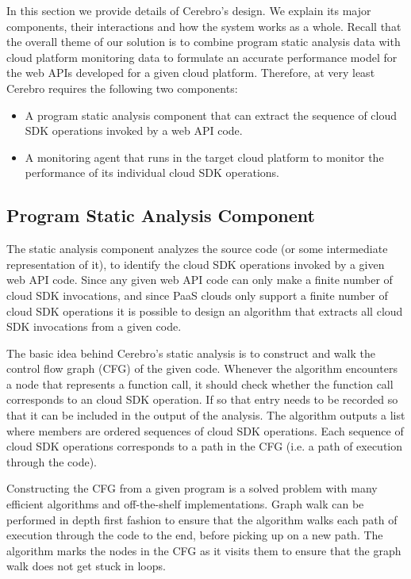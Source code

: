 In this section we provide details of Cerebro's design. We explain its major components, their interactions and how the 
system works as a whole. Recall that the overall theme of our solution is to combine program
static analysis data with cloud platform monitoring data to formulate an accurate performance model for the 
web APIs developed for a given cloud platform. Therefore, at very least Cerebro requires the following two components:

\begin{itemize}
\item A program static analysis component that can extract the sequence of cloud SDK operations invoked by a web API
code.
\item A monitoring agent that runs in the target cloud platform to monitor the performance of its individual cloud SDK
operations.
\end{itemize}
 
 \subsection{Program Static Analysis Component}
 The static analysis component analyzes the source code (or some intermediate representation of it), to identify
 the cloud SDK operations invoked by a given web API code. Since any given web API code can only make a finite
 number of cloud SDK invocations, and since PaaS clouds only support a finite number of cloud
 SDK operations it is possible to design an algorithm that
 extracts all cloud SDK invocations from a given code. 
 
 The basic idea behind Cerebro's static analysis is to construct and walk the
 control flow graph (CFG) of the given code. Whenever the algorithm encounters a node that represents a function call,
 it should check whether the function call corresponds to an cloud SDK operation. If so that entry needs to be recorded
 so that it can be included in the output of the analysis. The algorithm outputs a list where members are ordered
sequences of cloud SDK operations. Each sequence of cloud SDK operations corresponds to a path in the CFG
(i.e. a path of execution through the code). 
 
 Constructing the CFG from a given program
 is a solved problem with many efficient algorithms and off-the-shelf implementations. Graph walk can be performed in depth first 
 fashion to ensure that the algorithm walks each path of execution through the code to the end, before picking up on
 a new path. The algorithm marks the nodes in the CFG as it visits them to ensure that the graph walk does not get stuck in loops.
 
